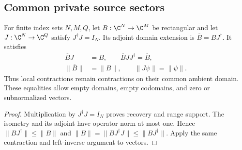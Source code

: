 \subsection{Common private source sectors}

\begin{definition}
    \label{def:construction_domain_extension}
    \leanok
    For finite index sets $N,M,Q$, let $B:\C^N\to\C^M$ be rectangular and let
    $J:\C^N\to\C^Q$ satisfy $J^\dagger J=I_N$. Its adjoint domain
    extension is $\overline B=BJ^\dagger$. It satisfies
    \begin{align}
        \overline BJ            & =B,
        \qquad \overline BJJ^\dagger=\overline B,
        \label{eq:construction_domain_recovery}    \\
        \lVert\overline B\rVert & =\lVert B\rVert,
        \qquad \lVert J\psi\rVert=\lVert\psi\rVert.
        \label{eq:construction_domain_norm}
    \end{align}
    Thus local contractions remain contractions on their common
    ambient domain. These equalities allow empty domains, empty
    codomains, and zero or subnormalized vectors.
\end{definition}

\begin{proof}\leanok
    Multiplication by $J^\dagger J=I_N$ proves recovery and range
    support. The isometry and its adjoint have operator norm at most
    one. Hence $\lVert BJ^\dagger\rVert\leq\lVert B\rVert$ and
    $\lVert B\rVert=\lVert BJ^\dagger J\rVert\leq\lVert BJ^\dagger\rVert$.
    Apply the same contraction and left-inverse argument to vectors.
\end{proof}


